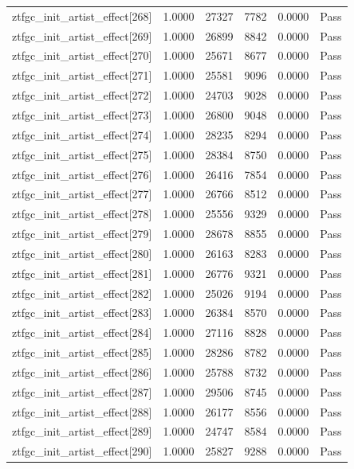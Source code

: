 \begin{table}[htbp]
\begin{tabular}{llrrll}
ztfgc\_init\_artist\_effect[268] & 1.0000 & 27327 & 7782 & 0.0000 & Pass \\
ztfgc\_init\_artist\_effect[269] & 1.0000 & 26899 & 8842 & 0.0000 & Pass \\
ztfgc\_init\_artist\_effect[270] & 1.0000 & 25671 & 8677 & 0.0000 & Pass \\
ztfgc\_init\_artist\_effect[271] & 1.0000 & 25581 & 9096 & 0.0000 & Pass \\
ztfgc\_init\_artist\_effect[272] & 1.0000 & 24703 & 9028 & 0.0000 & Pass \\
ztfgc\_init\_artist\_effect[273] & 1.0000 & 26800 & 9048 & 0.0000 & Pass \\
ztfgc\_init\_artist\_effect[274] & 1.0000 & 28235 & 8294 & 0.0000 & Pass \\
ztfgc\_init\_artist\_effect[275] & 1.0000 & 28384 & 8750 & 0.0000 & Pass \\
ztfgc\_init\_artist\_effect[276] & 1.0000 & 26416 & 7854 & 0.0000 & Pass \\
ztfgc\_init\_artist\_effect[277] & 1.0000 & 26766 & 8512 & 0.0000 & Pass \\
ztfgc\_init\_artist\_effect[278] & 1.0000 & 25556 & 9329 & 0.0000 & Pass \\
ztfgc\_init\_artist\_effect[279] & 1.0000 & 28678 & 8855 & 0.0000 & Pass \\
ztfgc\_init\_artist\_effect[280] & 1.0000 & 26163 & 8283 & 0.0000 & Pass \\
ztfgc\_init\_artist\_effect[281] & 1.0000 & 26776 & 9321 & 0.0000 & Pass \\
ztfgc\_init\_artist\_effect[282] & 1.0000 & 25026 & 9194 & 0.0000 & Pass \\
ztfgc\_init\_artist\_effect[283] & 1.0000 & 26384 & 8570 & 0.0000 & Pass \\
ztfgc\_init\_artist\_effect[284] & 1.0000 & 27116 & 8828 & 0.0000 & Pass \\
ztfgc\_init\_artist\_effect[285] & 1.0000 & 28286 & 8782 & 0.0000 & Pass \\
ztfgc\_init\_artist\_effect[286] & 1.0000 & 25788 & 8732 & 0.0000 & Pass \\
ztfgc\_init\_artist\_effect[287] & 1.0000 & 29506 & 8745 & 0.0000 & Pass \\
ztfgc\_init\_artist\_effect[288] & 1.0000 & 26177 & 8556 & 0.0000 & Pass \\
ztfgc\_init\_artist\_effect[289] & 1.0000 & 24747 & 8584 & 0.0000 & Pass \\
ztfgc\_init\_artist\_effect[290] & 1.0000 & 25827 & 9288 & 0.0000 & Pass \\

\end{tabular}
\end{table}
